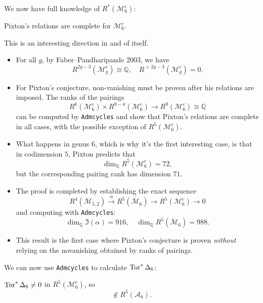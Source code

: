 \documentclass[reqno]{amsart} 
\begin{document}
We now have full knowledge of $R^\ast(\mathcal{M}_6^c)$:
\begin{theorem}
  Pixton's relations are complete for $\mathcal{M}_6^c$.
\end{theorem}
This is an interesting direction in and of itself.
\begin{itemize}
\item For all $g$, by Faber--Pandharipande 2003, we have
  \begin{equation*}
    R^{2 g - 3}(\mathcal{M}_{g}^c) \cong \mathbb{Q}, \quad R^{> 2 g - 3}(\mathcal{M}_g^c) = 0.
  \end{equation*}
\item For Pixton's conjecture, non-vanishing must be proven after his relations are imposed.  The ranks of the pairings
  \begin{equation*}
    R^k(\mathcal{M}_6^c) \times R^{9 - k}(\mathcal{M}_6^c) \rightarrow R^9(\mathcal{M}_6^c) \cong \mathbb{Q}
  \end{equation*}
  can be computed by \verb|Admcycles| and show that Pixton's relations are complete in all cases, with the possible exception of $R^5(\mathcal{M}_6^c)$.
\item   What happens in genus $6$, which is why it's the first interesting case, is that in codimension $5$, Pixton predicts that
  \begin{equation*}
    \dim_{\mathbb{Q}} R^5(\mathcal{M}_6^c) = 72,
  \end{equation*}
  but the corresponding pairing rank has dimension $71$.
\item The proof is completed by establishing the exact sequence
  \begin{equation*}
    R^4(\overline{\mathcal{M}}_{5, 2})
    \xrightarrow{\alpha}
    R^5(\overline{\mathcal{M}}_6)
    \rightarrow R^5(\mathcal{M}_6^c) \rightarrow 0
  \end{equation*}
  and computing with \verb|Admcycles|:
  \begin{equation*}
    \dim_{\mathbb{Q}} \Im(\alpha) = 916, \quad \dim_{\mathbb{Q}} R^5(\overline{\mathcal{M}}_6) = 988.
  \end{equation*}
\item This result is the first case where Pixton's conjecture is proven \emph{without  } relying on the novanishing obtained by ranks of pairings.
\end{itemize}
We can now use \verb|Admcycles| to calculate $\operatorname{Tor}^\ast \Delta_6$:
\begin{theorem}
  $\operatorname{Tor}^\ast \Delta_6 \neq 0$ in $R^5(\mathcal{M}_6^c)$, so
  \begin{equation*}
    [\mathcal{A}_1 \times \mathcal{A}_5] \notin R^5(\mathcal{A}_6).
  \end{equation*}
\end{theorem}
\end{document}
